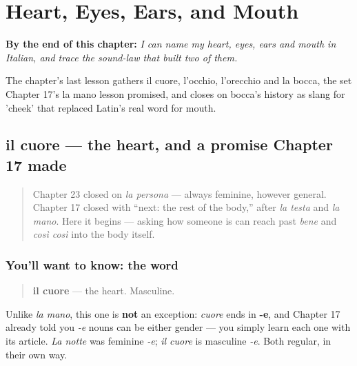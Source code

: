 
\chapter{Heart, Eyes, Ears, and Mouth}
\label{ch:it-heart-eyes-ears-mouth}

\begin{chapteropening}
\textbf{By the end of this chapter:} \emph{I can name my heart, eyes, ears and mouth in Italian, and trace the sound-law that built two of them.}

The chapter's last lesson gathers il cuore, l'occhio, l'orecchio and la bocca, the set Chapter 17's la mano lesson promised, and closes on bocca's history as slang for 'cheek' that replaced Latin's real word for mouth.
\end{chapteropening}

\section[il cuore]{il cuore — the heart, and a promise Chapter 17 made}

\label{lesson:IT-C24-cuore}



\begin{quote}
Chapter 23 closed on \emph{la persona} — always feminine, however general. Chapter 17 closed with \textquotedblleft{}next: the rest of the body,\textquotedblright{} after \emph{la testa} and \emph{la mano}. Here it begins — asking how someone is can reach past \emph{bene} and \emph{così così} into the body itself.
\end{quote}

\subsection*{You'll want to know: the word}
\begin{quote}
\textbf{il cuore} — the heart. Masculine.
\end{quote}

Unlike \emph{la mano}, this one is \textbf{not} an exception: \emph{cuore} ends in \textbf{-e}, and Chapter 17 already told you \emph{-e} nouns can be either gender — you simply learn each one with its article. \emph{La notte} was feminine \emph{-e}; \emph{il cuore} is masculine \emph{-e}. Both regular, in their own way.

